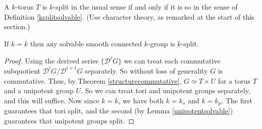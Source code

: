 \documentclass[10pt]{article}
\renewcommand{\(}{\left(}
\renewcommand{\)}{\right)}
\numberwithin{thm}{subsection}
\begin{document}
\begin{ex}\label{}
A $k$-torus $T$ is $k$-split in the usual sense if and only if it is so
in the sense of Definition \ref{ksplitsolvable}.
(Use character theory, as remarked at the start of this section.)
\end{ex}
\begin{ex}\label{}
If $k=\overline{k}$ then any solvable smooth connected $k$-group
is $k$-split.
\begin{proof}
 Using the derived series $\{\mathscr{D}^i G\}$
we can treat each commutative subquotient $\mathscr{D}^i G/\mathscr{D}^{i+1}G$
separately.
So without loss of generality $G$ is commutative.
Thus, by Theorem \ref{structurecommutative},
$G\simeq T\times U$ for a torus $T$ and a unipotent group $U$.
So we can treat tori and unipotent groups separately, and this will suffice.
Now since $k=\overline{k}$, we have both $k=k_s$
and $k=k_p$.
The first guarantees that tori split,
and the second (by Lemma \ref{unipotentsolvable})
guarantees that unipotent groups split.
\end{proof}
\end{ex}
\end{document}
